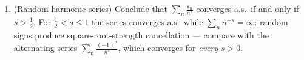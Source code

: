 \begin{problem}
\begin{enumerate}[resume]
        (b) Show $\E T_n^4 \leq 3s_n^4$.
        (c) Deduce $\P\bigl(\abs{T_n} > \frac{s_n}2\bigr)
        \geq \frac3{16}$ and conclude that
        $\sum_nx_n\varepsilon_n$ diverges a.s.; hence the
        dichotomy
        \[
        \sum_nx_n\varepsilon_n\ \text{converges a.s.}
        \iff \sum_nx_n^2 < \infty .
        \]
  \item (Random harmonic series) Conclude that
        $\sum_n\frac{\varepsilon_n}{n^s}$ converges a.s.\
        if and only if $s > \frac12$. For $\frac12 < s \leq
        1$ the series converges a.s.\ while
        $\sum_nn^{-s} = \infty$: random signs produce
        square-root-strength cancellation --- compare with
        the alternating series $\sum_n\frac{(-1)^n}{n^s}$,
        which converges for \emph{every} $s > 0$.
\end{enumerate}


\end{problem}

